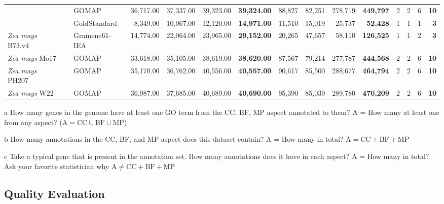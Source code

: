 \documentclass[utf8]{frontiersSCNS}
\begin{document}
\begin{table}[t]
{\begin{threeparttable}
\begin{tabular}{lrlrrr>{\bfseries}r|rrr>{\bfseries}r|rrr>{\bfseries}r}
 &  & GOMAP & 36,717.00 & 37,337.00 & 39,323.00 & 39,324.00 & 88,827 & 82,251 & 278,719 & 449,797 & 2 & 2 & 6 & 10\\

\rowcolor{gray!6}   &  & GoldStandard & 8,349.00 & 10,067.00 & 12,120.00 & 14,971.00 & 11,510 & 15,019 & 25,737 & 52,428 & 1 & 1 & 1 & 3\\

\multirow{-3}{*}{\raggedright\arraybackslash \textit{Zea mays} B73.v4} &  & Gramene61-IEA & 14,774.00 & 22,064.00 & 23,965.00 & 29,152.00 & 20,265 & 47,657 & 58,110 & 126,525 & 1 & 1 & 2 & 3\\

\rowcolor{gray!6}  \textit{Zea mays} Mo17 &  & GOMAP & 33,618.00 & 35,105.00 & 38,619.00 & 38,620.00 & 87,567 & 79,214 & 277,787 & 444,568 & 2 & 2 & 6 & 10\\

\textit{Zea mays} PH207 &  & GOMAP & 35,170.00 & 36,762.00 & 40,556.00 & 40,557.00 & 90,617 & 85,500 & 288,677 & 464,794 & 2 & 2 & 6 & 10\\

\rowcolor{gray!6}  \textit{Zea mays} W22 & \multirow{-10}{*}{\raggedleft\arraybackslash 100} & GOMAP & 36,987.00 & 37,685.00 & 40,689.00 & 40,690.00 & 95,390 & 85,039 & 289,780 & 470,209 & 2 & 2 & 6 & 10\\
\bottomrule
\end{tabular}
\begin{tablenotes}
\item[a] How many genes in the genome have at least one GO term from the CC, BF, MP aspect annotated to them? A = How many at least one from any aspect? ($\textrm{A} = \textrm{CC} \cup \textrm{BF} \cup \textrm{MP}$)
\item[b] How many annotations in the CC, BF, and MP aspect does this dataset contain? A = How many in total? $\textrm{A} = \textrm{CC} + \textrm{BF} + \textrm{MP}$
\item[c] Take a typical gene that is present in the annotation set. How many annotations does it have in each aspect? A = How many in total? Ask your favorite statistician why $\textrm{A} \neq \textrm{CC} + \textrm{BF} +\textrm{MP}$
\end{tablenotes}
\end{threeparttable}}
\end{table}

\hypertarget{quality-evaluation}{%
\subsection{Quality Evaluation}\label{quality-evaluation}}
\end{document}
